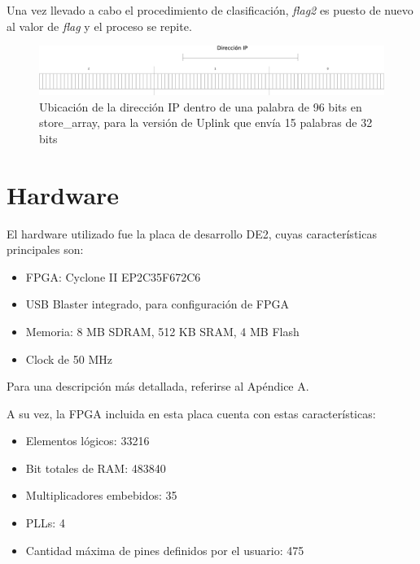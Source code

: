 Una vez llevado a cabo el procedimiento de clasificación, \textit{flag2} es puesto de nuevo al valor de \textit{flag }y el proceso se repite.


\begin{figure}[H]
  \centering
	\includegraphics[scale=0.10]{4-implementacion/graf/ip15pal.eps}
  \caption{Ubicación de la dirección IP dentro de una palabra de 96 bits en store\_array, para la versión de Uplink que envía 15 palabras de 32 bits}
  \label{fig:ip15pal}
\end{figure}


\section{Hardware}

El hardware utilizado fue la placa de desarrollo DE2, cuyas características principales son:

\begin{itemize}
	\item FPGA: Cyclone II EP2C35F672C6
	\item USB Blaster integrado, para configuración de FPGA
	\item Memoria: 8 MB SDRAM, 512 KB SRAM, 4 MB Flash
	\item Clock de 50 MHz
\end{itemize}

Para una descripción más detallada, referirse al Apéndice A.

A su vez, la FPGA incluida en esta placa cuenta con estas características:

\begin{itemize}
	\item Elementos lógicos: 33216
	\item Bit totales de RAM: 483840
	\item Multiplicadores embebidos: 35
	\item PLLs: 4
	\item Cantidad máxima de pines definidos por el usuario: 475
\end{itemize}


